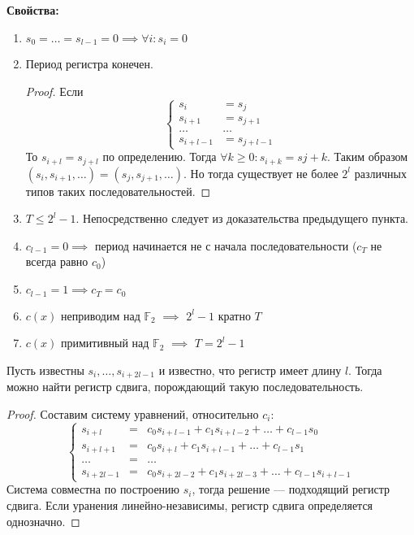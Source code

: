 {\bfseries Свойства:}
\begin{enumerate}
\item $s_0 = \ldots = s_{l-1} = 0 \implies \forall i \colon s_i = 0$
\item Период регистра конечен.
\begin{proof}
Если $$
\left\{\begin{array}{rl} s_i &= s_j \\
                         s_{i+1} &= s_{j+1} \\
                         \ldots & \ldots \\
                         s_{i+l-1} &= s_{j+l-1} 
        \end{array}\right.$$
   То $s_{i+l} = s_{j+l}$ по определению. Тогда $\forall k \ge 0 \colon s_{i+k} = s{j+k}$.
   Таким образом $(s_i, s_{i+1}, \ldots) = (s_j, s_{j+1}, \ldots)$. Но
   тогда существует не более $2^l$ различных типов таких последовательностей.

\end{proof}
\item $T \le 2^l - 1$. Непосредственно следует из доказательства предыдущего пункта.
\item $c_{l-1} = 0 \implies $ период начинается не с начала последовательности
      ($c_T$ не всегда равно $c_0$)
\item $c_{l-1} = 1 \implies c_T = c_0$
\item $c(x)$ неприводим над $\mathbb{F}_2$ $\implies$ $2^l-1$ кратно $T$
\item $c(x)$ примитивный над $\mathbb{F}_2$ $\implies$ $T = 2^l - 1$
\end{enumerate}

\begin{proposition}
Пусть известны $s_i, \ldots, s_{i+2l-1}$ и известно, что регистр имеет длину
$l$. Тогда можно найти регистр сдвига, порождающий такую последовательность.
\end{proposition}

\begin{proof}
Составим систему уравнений, относительно $c_i$:
$$\left\{\begin{array}{rcl}   
   s_{i+l} &=& c_0 s_{i+l - 1} + c_1 s_{i+l-2} + \ldots + c_{l-1} s_0\\
   s_{i+l+1} &=& c_0 s_{i+l} + c_1 s_{i+l-1} + \ldots + c_{l-1} s_1\\   
   \ldots &=& \ldots\\
   s_{i+2l-1} &=& c_0 s_{i+2l - 2} + c_1 s_{i+2l-3} + \ldots + c_{l-1} s_{i+l-1}
   
\end{array}\right.$$
Система совместна по построению $s_i$, тогда решение --- подходящий регистр
сдвига. Если уранения линейно-независимы, регистр сдвига определяется однозначно.
\end{proof}

